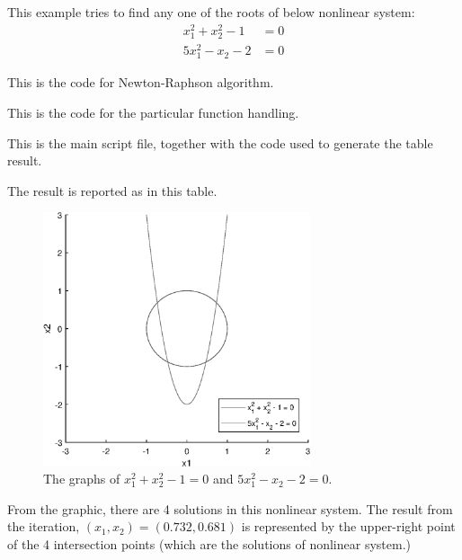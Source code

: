 \documentclass{article}
\begin{document}
\section{}

This example tries to find any one of the roots of below nonlinear system:
\begin{align*}
    x_1^2 + x_2^2 - 1 &= 0 \\
    5x_1^2 - x_2 - 2 &= 0
\end{align*}

This is the code for Newton-Raphson algorithm.



This is the code for the particular function handling.



This is the main script file, together with the code used to generate the table result.



The result is reported as in this table.



\begin{figure}[h]
    \centering
    \includegraphics[width = 0.7\textwidth]{graph}
    \caption{The graphs of $x_1^2 + x_2^2 - 1 = 0$ and $5x_1^2 - x_2 - 2 = 0$.}
\end{figure}

From the graphic, there are 4 solutions in this nonlinear system. The result from the iteration, $(x_1,x_2) = (0.732,0.681)$ is represented by the upper-right point of the 4 intersection points (which are the solutions of nonlinear system.) 
\end{document}

